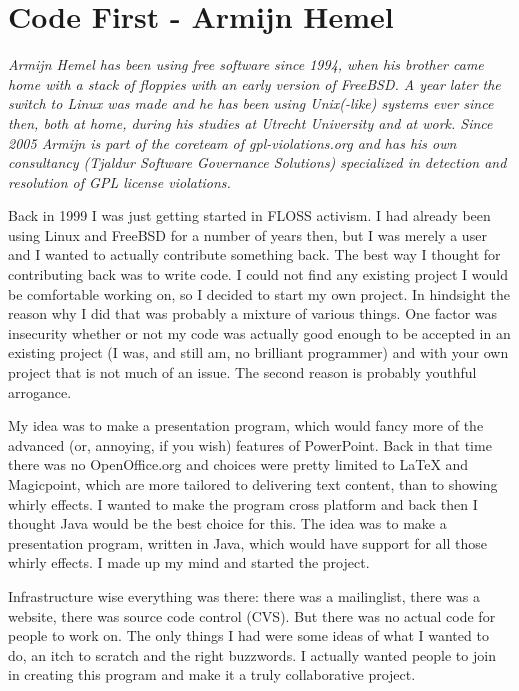 \chapter{Code First - Armijn Hemel}

\textit{Armijn Hemel has been using free software since 1994, when his brother
came home with a stack of floppies with an early version of FreeBSD. A year
later the switch to Linux was made and he has been using Unix(-like) systems
ever since then, both at home, during his studies at Utrecht University and at
work.
Since 2005 Armijn is part of the coreteam of gpl-violations.org and has his own
consultancy (Tjaldur Software Governance Solutions) specialized in detection and
resolution of GPL license violations.}

Back in 1999 I was just getting started in FLOSS activism. I had already been
using Linux and FreeBSD for a number of years then, but I was merely a user and
I wanted to actually contribute something back. The best way I thought for
contributing back was to write code. I could not find any existing project I
would be comfortable working on, so I decided to start my own project. In
hindsight the reason why I did that was probably a mixture of various things.
One factor was insecurity whether or not my code was actually good enough to be
accepted in an existing project (I was, and still am, no brilliant programmer)
and with your own project that is not much of an issue. The second reason is
probably youthful arrogance.

My idea was to make a presentation program, which would fancy more of the
advanced (or, annoying, if you wish) features of PowerPoint. Back in that time
there was no OpenOffice.org and choices were pretty limited to LaTeX and
Magicpoint, which are more tailored to delivering text content, than to showing
whirly effects. I wanted to make the program cross platform and back then I
thought Java would be the best choice for this. The idea was to make a
presentation program, written in Java, which would have support for all those
whirly effects. I made up my mind and started the project.

Infrastructure wise everything was there: there was a mailinglist, there was a
website, there was source code control (CVS). But there was no actual code for
people to work on. The only things I had were some ideas of what I wanted to do,
an itch to scratch and the right buzzwords. I actually wanted people to join in
creating this program and make it a truly collaborative project.


